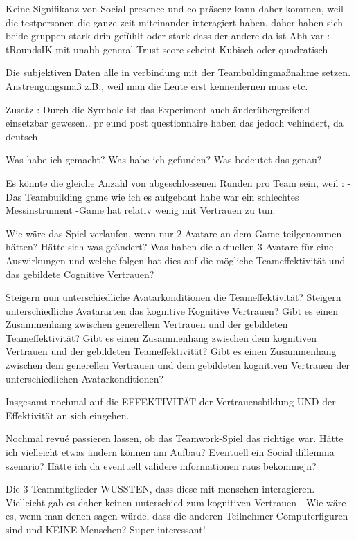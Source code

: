 \documentclass[a4paper,11pt]{article}%
\renewcommand{\\}{\vspace*{0.5\baselineskip} \newline}
\begin{document}
Keine Signifikanz von Social presence und co präsenz kann daher kommen, weil die testpersonen die ganze zeit miteinander interagiert haben. daher haben sich beide gruppen stark drin gefühlt oder stark dass der andere da ist
Abh var : tRoundsIK mit unabh general-Trust score scheint Kubisch oder quadratisch

Die subjektiven Daten alle in verbindung mit der Teambuldingmaßnahme setzen. Anstrengungsmaß z.B., weil man die Leute erst kennenlernen muss etc.

Zusatz :
Durch die Symbole ist das Experiment auch änderübergreifend einsetzbar gewesen.. pr eund post questionnaire haben das jedoch vehindert, da deutsch

	Was habe ich gemacht?
	Was habe ich gefunden? 
	Was bedeutet das genau?
	
Es könnte die gleiche Anzahl von abgeschlossenen Runden pro Team sein, weil :
-Das Teambuilding game wie ich es aufgebaut habe war ein schlechtes Messinstrument
-Game hat relativ wenig mit Vertrauen zu tun.

Wie wäre das Spiel verlaufen, wenn nur 2 Avatare an dem Game teilgenommen hätten?
Hätte sich was geändert? Was haben die aktuellen 3 Avatare für eine Auswirkungen und welche folgen hat dies auf die mögliche Teameffektivität und das gebildete Cognitive Vertrauen?

Steigern nun unterschiedliche Avatarkonditionen die Teameffektivität?
Steigern unterschiedliche Avatararten das kognitive Kognitive Vertrauen?
Gibt es einen Zusammenhang zwischen generellem Vertrauen und der gebildeten Teameffektivität?
Gibt es einen Zusammenhang zwischen dem kognitiven Vertrauen und der gebildeten Teameffektivität?
Gibt es einen Zusammenhang zwischen dem generellen Vertrauen und dem gebildeten kognitiven Vertrauen der unterschiedlichen Avatarkonditionen?

Insgesamt nochmal auf die EFFEKTIVITÄT der Vertrauensbildung UND der Effektivität an sich eingehen.

Nochmal revué passieren lassen, ob das Teamwork-Spiel das richtige war. Hätte ich vielleicht etwas ändern können am Aufbau? Eventuell ein Social dillemma szenario? Hätte ich da eventuell validere informationen raus bekommejn?

Die 3 Teammitglieder WUSSTEN, dass diese mit menschen interagieren. Vielleicht gab es daher keinen unterschied zum kognitiven Vertrauen - Wie wäre es, wenn man denen sagen würde, dass die anderen Teilnehmer Computerfiguren sind und KEINE Menschen? Super interessant!
\end{document}
